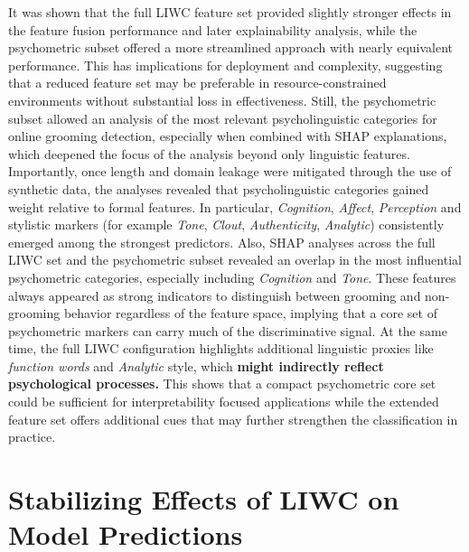 It was shown that the full LIWC feature set provided slightly stronger effects in the feature fusion performance and later explainability analysis, while the psychometric subset offered a more streamlined approach with nearly equivalent performance. This has implications for deployment and complexity, suggesting that a reduced feature set may be preferable in resource-constrained environments without substantial loss in effectiveness. Still, the psychometric subset allowed an analysis of the most relevant psycholinguistic categories for online grooming detection, especially when combined with SHAP explanations, which deepened the focus of the analysis beyond only linguistic features. Importantly, once length and domain leakage were mitigated through the use of synthetic data, the analyses revealed that psycholinguistic categories gained weight relative to formal features. In particular, \textit{Cognition}, \textit{Affect}, \textit{Perception} and stylistic markers (for example \textit{Tone}, \textit{Clout}, \textit{Authenticity}, \textit{Analytic}) consistently emerged among the strongest predictors. Also, SHAP analyses across the full LIWC set and the psychometric subset revealed an overlap in the most influential psychometric categories, especially including \textit{Cognition} and \textit{Tone}. These features always appeared as strong indicators to distinguish between grooming and non-grooming behavior regardless of the feature space, implying that a core set of psychometric markers can carry much of the discriminative signal. At the same time, the full LIWC configuration highlights additional linguistic proxies like \textit{function words} and \textit{Analytic} style, which \textbf{might indirectly reflect psychological processes.} This shows that a compact psychometric core set could be sufficient for interpretability focused applications while the extended feature set offers additional cues that may further strengthen the classification in practice.
\section{Stabilizing Effects of LIWC on Model Predictions}

